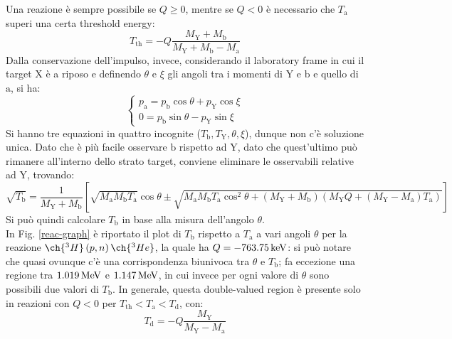 Una reazione è sempre possibile se $ Q \ge 0 $, mentre se $ Q < 0 $ è necessario che $ T_{\mathrm{a}} $ superi una certa threshold energy:
\begin{equation}
	T_{\text{th}} = -Q \frac{M_{\mathrm{Y}} + M_{\mathrm{b}}}{M_{\mathrm{Y}} + M_{\mathrm{b}} - M_{\mathrm{a}}}
	\label{eq:6.1}
\end{equation}
Dalla conservazione dell'impulso, invece, considerando il laboratory frame in cui il target $ \mathrm{X} $ è a riposo e definendo $ \theta $ e $ \xi $ gli angoli tra i momenti di $ \mathrm{Y} $ e $ \mathrm{b} $ e quello di $ \mathrm{a} $, si ha:
\begin{equation*}
	\begin{cases}
		p_{\mathrm{a}} = p_{\mathrm{b}} \cos \theta + p_{\mathrm{Y}} \cos \xi \\
		0 = p_{\mathrm{b}} \sin \theta - p_{\mathrm{Y}} \sin \xi
	\end{cases}
\end{equation*}
Si hanno tre equazioni in quattro incognite ($ T_{\mathrm{b}}, T_{\mathrm{Y}}, \theta, \xi $), dunque non c'è soluzione unica. Dato che è più facile osservare $ \mathrm{b} $ rispetto ad $ \mathrm{Y} $, dato che quest'ultimo può rimanere all'interno dello strato target, conviene eliminare le osservabili relative ad $ \mathrm{Y} $, trovando:
\begin{equation}
	\sqrt{T_{\mathrm{b}}} = \frac{1}{M_{\mathrm{Y}} + M_{\mathrm{b}}} \left[ \sqrt{M_{\mathrm{a}} M_{\mathrm{b}} T_{\mathrm{a}}} \cos \theta \pm \sqrt{M_{\mathrm{a}} M_{\mathrm{b}} T_{\mathrm{a}} \cos^2 \theta + \left( M_{\mathrm{Y}} + M_{\mathrm{b}} \right) \left( M_{\mathrm{Y}} Q + (M_{\mathrm{Y}} - M_{\mathrm{a}}) T_{\mathrm{a}} \right)} \right]
	\label{eq:6.2}
\end{equation}
Si può quindi calcolare $ T_{\mathrm{b}} $ in base alla misura dell'angolo $ \theta $.\\
In Fig. \ref{reac-graph} è riportato il plot di $ T_{\mathrm{b}} $ rispetto a $ T_{\mathrm{a}} $ a vari angoli $ \theta $ per la reazione $ \ch{^3H} \left( p,n \right) \ch{^3He} $, la quale ha $ Q = -763.75\,\mathrm{keV} $: si può notare che quasi ovunque c'è una corrispondenza biunivoca tra $ \theta $ e $ T_{\mathrm{b}} $; fa eccezione una regione tra $ 1.019\,\mathrm{MeV} $ e $ 1.147\,\mathrm{MeV} $, in cui invece per ogni valore di $ \theta $ sono possibili due valori di $ T_{\mathrm{b}} $. In generale, questa double-valued region è presente solo in reazioni con $ Q < 0 $ per $ T_{\text{th}} < T_{\mathrm{a}} < T_{\text{d}} $, con:
\begin{equation}
	T_{\text{d}} = - Q \frac{M_{\mathrm{Y}}}{M_{\mathrm{Y}} - M_{\mathrm{a}}}
	\label{eq:6.3}
\end{equation}


